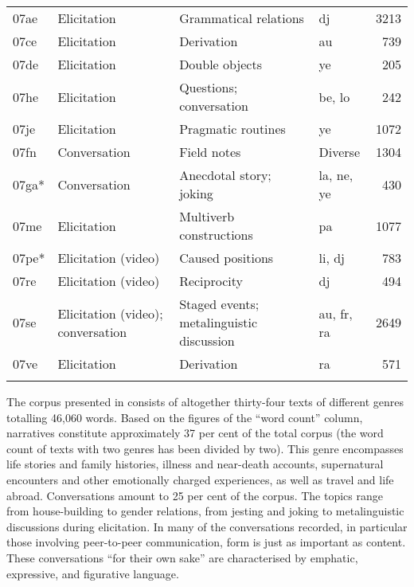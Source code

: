 \begin{longtable}{l >{\raggedright}p{2.1cm} >{\raggedright}p{4.5cm} lr}
07ae & Elicitation & Grammatical relations & dj & 3213\\
07ce & Elicitation & Derivation & au & 739\\
07de & Elicitation & Double objects & ye & 205\\
07he & Elicitation & Questions; conversation & be, lo & 242\\
07je & Elicitation & Pragmatic routines & ye & 1072\\
07fn & Conversation & Field notes & Diverse & 1304\\
07ga* & Conversation & Anecdotal story; joking & la, ne, ye & 430\\
07me & Elicitation & Multiverb constructions & pa & 1077\\
07pe* & Elicitation (video) & Caused positions & li, dj & 783\\
07re & Elicitation (video) & Reciprocity & dj & 494\\
07se & Elicitation (video); conversation & Staged events; metalinguistic discussion & au, fr, ra & 2649\\
07ve & Elicitation & Derivation & ra & 571\\
\lspbottomrule
\end{longtable}
The corpus presented in  consists of altogether thirty-four texts of different genres totalling 46,060 words. Based on the figures of the “word count” column, narratives constitute approximately 37 per cent of the total corpus (the word count of texts with two genres has been divided by two). This genre encompasses life stories and family histories, illness and near-death accounts, supernatural encounters and other emotionally charged experiences, as well as travel and life abroad. Conversations amount to 25 per cent of the corpus. The topics range from house-building to gender relations, from jesting and joking to metalinguistic discussions during elicitation. In many of the conversations recorded, in particular those involving peer-to-peer communication, form is just as important as content. These conversations “for their own sake” are characterised by emphatic, expressive, and figurative language. 

